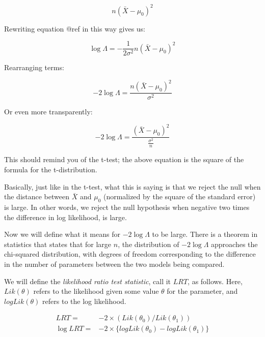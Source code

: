 \documentclass[
  12pt,
]{krantz}
\theoremstyle{definition}
\theoremstyle{definition}
\theoremstyle{definition}
\theoremstyle{definition}
\theoremstyle{remark}
\begin{document}
\begin{equation}
n(\bar{X} - \mu_0)^2
\end{equation}

Rewriting equation @ref\label{eq:loglambda} in this way gives us:

\begin{equation}
\log \Lambda = -\frac{1}{2\sigma^2}   n(\bar{X} - \mu_0)^2 
\end{equation}

Rearranging terms:

\begin{equation}
-2 \log \Lambda =    \frac{n(\bar{X} - \mu_0)^2 }{\sigma^2}
\end{equation}

Or even more transparently:

\begin{equation}
-2 \log \Lambda =    \frac{(\bar{X} - \mu_0)^2 }{\frac{\sigma^2}{n}}
\end{equation}

This should remind you of the t-test; the above equation is the square of the formula for the t-distribution.

Basically, just like in the t-test, what this is saying is that we reject the null when the distance between \(\bar{X}\) and \(\mu_0\) (normalized by the square of the standard error) is large. In other words, we reject the null hypothesis when negative two times the difference in log likelihood, is large.

Now we will define what it means for \(-2\log \Lambda\) to be large. There is a theorem in statistics that states that for large \(n\), the distribution of \(-2\log \Lambda\) approaches the chi-squared distribution, with degrees of freedom corresponding to the difference in the number of parameters between the two models being compared.

We will define the \emph{likelihood ratio test statistic}, call it \(LRT\), as follows. Here, \(Lik(\theta)\) refers to the likelihood given some value \(\theta\) for the parameter, and
\(logLik(\theta)\) refers to the log likelihood.

\begin{equation}
\begin{split}
LRT =& -2\times (Lik(\theta_0)/Lik(\theta_1)) \\
\log LRT =& -2\times \{logLik(\theta_0)-logLik(\theta_1)\}\\
\end{split}
\end{equation}
\end{document}
